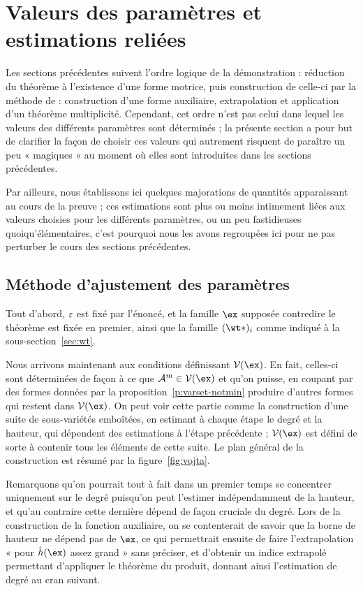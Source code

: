
\section{Valeurs des paramètres et estimations reliées}
\label{sec:vojta-adjust}

Les sections précédentes suivent l'ordre logique de la démonstration :
réduction du théorème à l'existence d'une forme motrice, puis construction
de celle-ci par la méthode de \TS : construction d'une forme auxiliaire,
extrapolation et application d'un théorème multiplicité. Cependant, cet ordre
n'est pas celui dans lequel les valeurs des différents paramètres sont
déterminés ; la présente section a pour but de clarifier la façon de choisir
ces valeurs qui autrement risquent de paraître un peu « magiques » au moment
où elles sont introduites dans les sections précédentes.

Par ailleurs, nous établissons ici quelques majorations  de
quantités apparaissant au cours de la preuve ; ces estimations sont plus ou
moins intimement liées aux valeurs choisies pour les différents paramètres, ou
un peu fastidieuses quoiqu'élémentaires, c'est pourquoi nous les avons
regroupées ici pour ne pas perturber le cours des sections précédentes.


\subsection{Méthode d'ajustement des paramètres}

Tout d'abord, \( \varepsilon \) est fixé par l'énoncé, et la famille \( \ex \)
supposée contredire le théorème est fixée en premier, ainsi que la famille \(
  (\wt*)_\fct \) comme indiqué à la sous-section~\vref{sec:wt}.

Nous arrivons maintenant aux conditions définissant \( \varset(\ex) \). En
fait, celles-ci sont déterminées de façon à ce que \( \va^m \in
  \varset(\ex) \) et qu'on puisse, en coupant par des formes données par la
proposition~\vref{p:varset-notmin} produire d'autres formes qui restent dans \(
  \varset(\ex) \). On peut voir cette partie comme la construction d'une
suite de sous-variétés emboîtées, en estimant à chaque étape le degré et la
hauteur, qui dépendent des estimations à l'étape précédente ; \( \varset(\ex)
\) est défini de sorte à contenir tous les éléments de cette suite. Le plan
général de la construction est résumé par la figure~\vref{fig:vojta}.
\afterpage{}

Remarquons qu'on pourrait tout à fait dans un premier temps se concentrer
uniquement sur le degré puisqu'on peut l'estimer indépendamment de la hauteur,
et qu'au contraire cette dernière dépend de façon cruciale du degré. Lors de
la construction de la fonction auxiliaire, on se contenterait de savoir que la
borne de hauteur ne dépend pas de \( \ex \), ce qui permettrait ensuite de
faire l'extrapolation « pour \( \hautn\ex \) assez grand » sans préciser, et
d'obtenir un indice extrapolé permettant d'appliquer le théorème du produit,
donnant ainsi l'estimation de degré au cran suivant.

